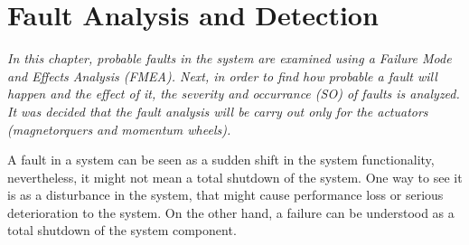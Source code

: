 \chapter{Fault  Analysis and Detection}
\textit{In this chapter, probable faults in the system are examined using a  Failure Mode and Effects Analysis (FMEA). Next, in order to find how probable a fault will happen and the effect of it, the severity and occurrance (SO)  of faults is analyzed. It was decided that the fault analysis will be carry out only for the actuators (magnetorquers and momentum wheels).}


A fault in a system can be seen as a sudden shift in the system functionality, nevertheless, it might not mean a total shutdown of the system. One way to see it is as a disturbance in the system, that might cause performance loss or serious deterioration to the system. On the other hand, a failure can be understood as a total shutdown of the system component. 

